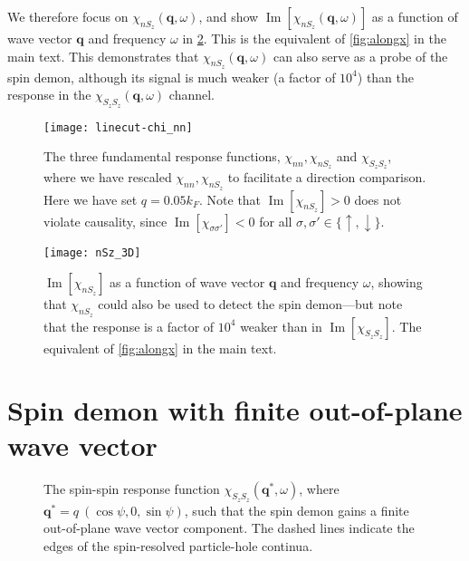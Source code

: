 \documentclass[aps,prb,reprint,twocolumns,superscriptaddress,nofootinbib]{revtex4-2}
\DeclareMathOperator{\Imm}{Im}
\newcommand{\kF}{k_{F}}
\begin{document}
	We therefore focus on $\chi_{nS_z}(\bm q,\omega)$, and show $\Imm[\chi_{nS_z}(\bm q,\omega)]$ as a function of wave vector $\bm q$ and frequency $\omega$ in \cref{fig:chi-nSz}. This is the equivalent of \cref{fig:alongx} in the main text. This demonstrates that $\chi_{nS_z}(\bm q,\omega) $ can also serve as a probe of the spin demon, although its signal is much weaker (a factor of $10^4$) than the response in the $\chi_{S_zS_z}(\bm q,\omega)$ channel.
	\begin{figure}
		\texttt{[image: linecut-chi\_nn]}
		\caption{The three fundamental response functions, $\chi_{nn}, \chi_{nS_z}$ and $\chi_{S_zS_z}$, where we have rescaled $\chi_{nn}, \chi_{nS_z}$ to facilitate a direction comparison. Here we have set $q=0.05\kF$. Note that $\Imm[\chi_{nS_z}]>0$ does not violate causality, since $\Imm[\chi_{\sigma\sigma'}]<0$ for all $\sigma,\sigma'\in\lbrace\uparrow,\downarrow\rbrace$. \label{fig:all-chis} }
	\end{figure}
	
	\begin{figure}
		\texttt{[image: nSz\_3D]}
		\caption{$\Imm[\chi_{nS_z}]$ as a function of wave vector $\bm q$ and frequency $\omega$, showing that $\chi_{nS_z}$ could also be used to detect the spin demon---but note that the response is a factor of $10^4$ weaker than in $\Imm[\chi_{S_zS_z}]$. The equivalent of \cref{fig:alongx} in the main text. \label{fig:chi-nSz}}
	\end{figure}
	
	
	
	\section{Spin demon with finite out-of-plane wave vector}
	\begin{figure*}
		\caption{The spin-spin response function $\chi_{S_zS_z}(\bm q^*,\omega)$, where $\bm q^*=q\ (\cos\psi,0,\sin\psi)$, such that the spin demon gains a finite out-of-plane wave vector component. The dashed lines indicate the edges of the spin-resolved particle-hole continua. \label{fig:oop}}
	\end{figure*}
	
\end{document}
